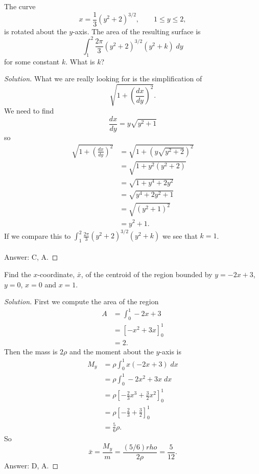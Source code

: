 \begin{problem}
The curve
\[
x=\frac{1}{3}\left(y^2+2\right)^{3/2},\qquad 1\leq y\leq 2,
\]
is rotated about the $y$-axis. The area of the resulting surface is
\[
\int_1^2\frac{2\pi}{3}\left( y^2+2\right)^{3/2}(y^2+k)\;dy
\]
for some constant $k$. What is $k$?
\end{problem}
\begin{proof}[Solution]
What we are really looking for is the simplification of
\[
\sqrt{1+\left(\frac{dx}{dy}\right)^2}.
\]
We need to find
\[
\frac{dx}{dy}=y\sqrt{y^2+1}
\]
so
\begin{align*}
\sqrt{1+\left(\frac{dx}{dy}\right)^2}
&=\sqrt{1+\left(y\sqrt{y^2+2}\right)^2}\\
&=\sqrt{1+y^2\left(y^2+2\right)}\\
&=\sqrt{1+y^4+2y^2}\\
&=\sqrt{y^4+2y^2+1}\\
&=\sqrt{\left(y^2+1\right)^2}\\
&=y^2+1.
\end{align*}
If we compare this to
$\displaystyle\int_1^2\frac{2\pi}{3}\left(y^2+2\right)^{3/2}\left(y^2+k\right)$
we see that $k=1$.
\\\\
Answer: {\color{Red} C}, {\color{Green} A}.
\end{proof}

\begin{problem}
Find the $x$-coordinate, $\bar x$, of the centroid of the region bounded by
$y=-2x+3$, $y=0$, $x=0$ and $x=1$.
\end{problem}
\begin{proof}[Solution]
First we compute the area of the region
\begin{align*}
A&=\int_0^1-2x+3\\
 &=\left[-x^2+3x\right]_0^1\\
 &=2.
\end{align*}
Then the mass is $2\rho $ and the moment about the $y$-axis is
\begin{align*}
M_y&=\rho\int_0^1 x(-2x+3)\;dx\\
   &=\rho\int_0^1 -2x^2+3x\;dx\\
   &=\rho\left[-\frac{2}{3}x^3+\frac{3}{2}x^2\right]_0^1\\
   &=\rho\left[-\frac{2}{3}+\frac{3}{2}\right]_0^1\\
   &=\frac{5}{6}\rho.
\end{align*}
So
\[
\bar x=\frac{M_y}{m}=\frac{(5/6)rho}{2\rho}=\boxed{\frac{5}{12}.}
\]
Answer: {\color{Red} D}, {\color{Green} A}.
\end{proof}

